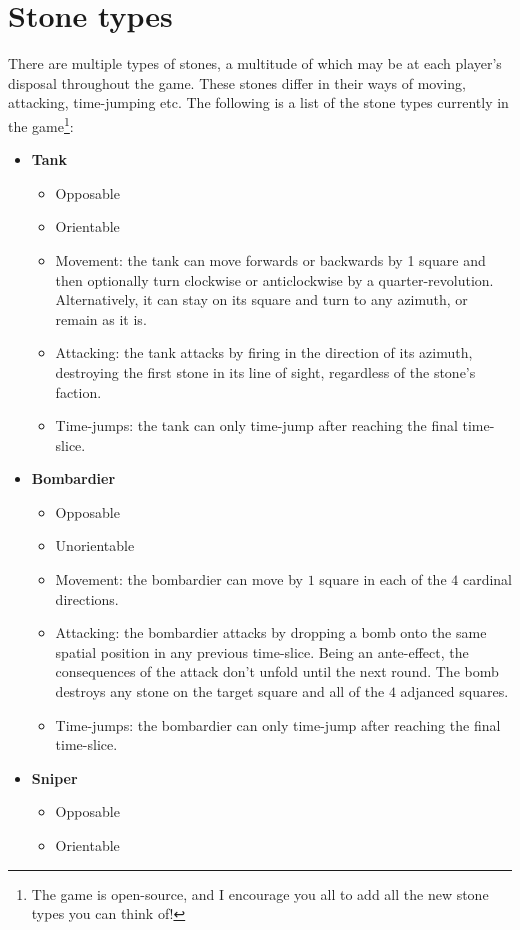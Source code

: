 \documentclass[12pt]{article}
\begin{document}
	\section{Stone types}\label{sec:stone types}
	There are multiple types of stones, a multitude of which may be at each player's disposal throughout the game. These stones differ in their ways of moving, attacking, time-jumping etc. The following is a list of the stone types currently in the game\footnote{The game is open-source, and I encourage you all to add all the new stone types you can think of!}:
	\begin{itemize}
	\item \textbf{Tank}
		\begin{itemize}
		\item Opposable
		\item Orientable
		\item Movement: the tank can move forwards or backwards by 1 square and then optionally turn clockwise or anticlockwise by a quarter-revolution. Alternatively, it can stay on its square and turn to any azimuth, or remain as it is.
		\item Attacking: the tank attacks by firing in the direction of its azimuth, destroying the first stone in its line of sight, regardless of the stone's faction.
		\item Time-jumps: the tank can only time-jump after reaching the final time-slice.
		\end{itemize}
	\item \textbf{Bombardier}
		\begin{itemize}
		\item Opposable
		\item Unorientable
		\item Movement: the bombardier can move by $1$ square in each of the $4$ cardinal directions.
		\item Attacking: the bombardier attacks by dropping a bomb onto the same spatial position in any previous time-slice. Being an ante-effect, the consequences of the attack don't unfold until the next round. The bomb destroys any stone on the target square and all of the $4$ adjanced squares.
		\item Time-jumps: the bombardier can only time-jump after reaching the final time-slice.
		\end{itemize}
	\item \textbf{Sniper}
		\begin{itemize}
		\item Opposable
		\item Orientable

\end{itemize}
\end{itemize}
\end{document}
